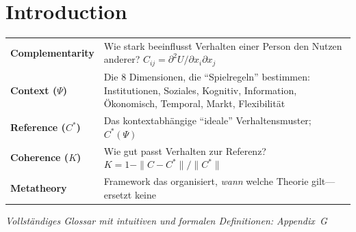 %
%
%
%

\section{Introduction}
\label{sec:introduction}

\begin{tcolorbox}[colback=gray!5!white, colframe=gray!75!black,
    title=\textbf{Begriffe in diesem Kapitel}]

\small
\begin{tabular}{@{}p{2.8cm}p{10cm}@{}}
\textbf{Complementarity} & Wie stark beeinflusst Verhalten einer Person den Nutzen anderer? $C_{ij} = \partial^2 U/\partial x_i \partial x_j$ \\[3pt]
\textbf{Context ($\Psi$)} & Die 8 Dimensionen, die ``Spielregeln'' bestimmen: Institutionen, Soziales, Kognitiv, Information, Ökonomisch, Temporal, Markt, Flexibilität \\[3pt]
\textbf{Reference ($C^*$)} & Das kontextabhängige ``ideale'' Verhaltensmuster; $C^*(\Psi)$ \\[3pt]
\textbf{Coherence ($K$)} & Wie gut passt Verhalten zur Referenz? $K = 1 - \|C-C^*\|/\|C^*\|$ \\[3pt]
\textbf{Metatheory} & Framework das organisiert, \emph{wann} welche Theorie gilt---ersetzt keine \\
\end{tabular}

\vspace{3pt}
\textit{Vollständiges Glossar mit intuitiven und formalen Definitionen: Appendix~G}
\end{tcolorbox}

